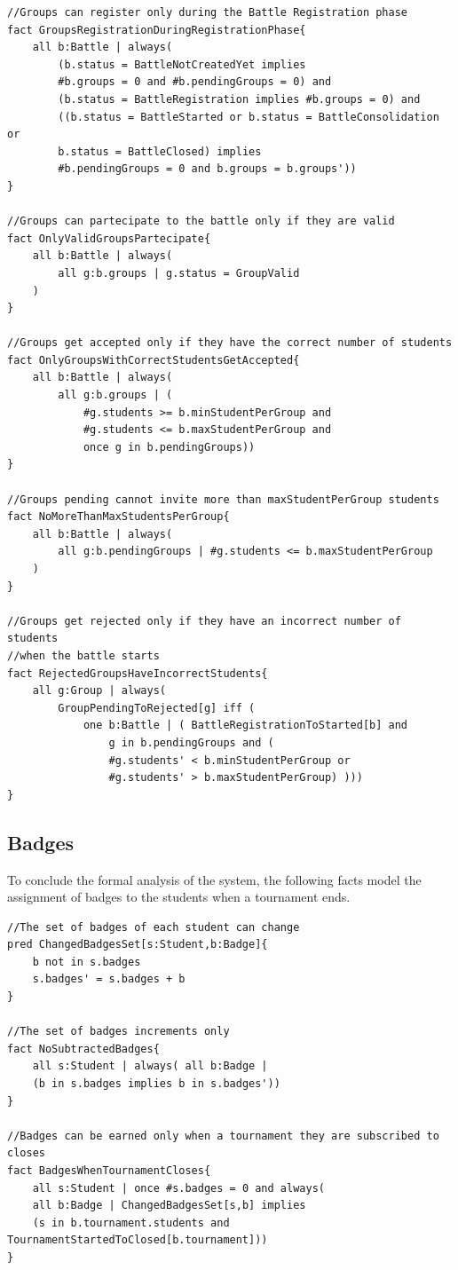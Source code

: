 \begin{verbatim}
//Groups can register only during the Battle Registration phase
fact GroupsRegistrationDuringRegistrationPhase{
    all b:Battle | always(
        (b.status = BattleNotCreatedYet implies
        #b.groups = 0 and #b.pendingGroups = 0) and
        (b.status = BattleRegistration implies #b.groups = 0) and
        ((b.status = BattleStarted or b.status = BattleConsolidation or
        b.status = BattleClosed) implies
        #b.pendingGroups = 0 and b.groups = b.groups'))
}

//Groups can partecipate to the battle only if they are valid
fact OnlyValidGroupsPartecipate{
    all b:Battle | always(
        all g:b.groups | g.status = GroupValid
    )
}

//Groups get accepted only if they have the correct number of students
fact OnlyGroupsWithCorrectStudentsGetAccepted{
    all b:Battle | always(
        all g:b.groups | (
            #g.students >= b.minStudentPerGroup and
            #g.students <= b.maxStudentPerGroup and 
            once g in b.pendingGroups))
}

//Groups pending cannot invite more than maxStudentPerGroup students
fact NoMoreThanMaxStudentsPerGroup{
    all b:Battle | always(
        all g:b.pendingGroups | #g.students <= b.maxStudentPerGroup
    )
}

//Groups get rejected only if they have an incorrect number of students
//when the battle starts
fact RejectedGroupsHaveIncorrectStudents{
    all g:Group | always(
        GroupPendingToRejected[g] iff (
            one b:Battle | ( BattleRegistrationToStarted[b] and
                g in b.pendingGroups and (
                #g.students' < b.minStudentPerGroup or
                #g.students' > b.maxStudentPerGroup) )))
}
\end{verbatim}

\subsection{Badges}
To conclude the formal analysis of the system, the following facts model the assignment of badges to the students when a tournament ends.

\begin{verbatim}
//The set of badges of each student can change
pred ChangedBadgesSet[s:Student,b:Badge]{
    b not in s.badges
    s.badges' = s.badges + b
}

//The set of badges increments only
fact NoSubtractedBadges{
    all s:Student | always( all b:Badge | 
    (b in s.badges implies b in s.badges'))
}
    
//Badges can be earned only when a tournament they are subscribed to closes
fact BadgesWhenTournamentCloses{
    all s:Student | once #s.badges = 0 and always(
    all b:Badge | ChangedBadgesSet[s,b] implies 
    (s in b.tournament.students and TournamentStartedToClosed[b.tournament]))
}
\end{verbatim}

